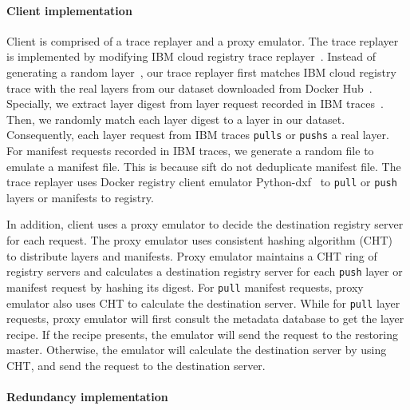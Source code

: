 \paragraph{Client implementation}
Client is comprised of a trace replayer and 
a proxy emulator.
The trace replayer is implemented by modifying IBM cloud registry trace replayer~\cite{xxx}.
Instead of generating a random layer~\cite{xxx},
our trace replayer first matches IBM cloud registry trace with 
the real layers from our dataset downloaded from Docker Hub~\cite{xxx, xxx}.
Specially, we extract layer digest from layer request recorded in IBM traces~\cite{xxx}.
Then, 
we randomly match each layer digest to a layer in our dataset. 
Consequently, each layer request from IBM traces \texttt{pulls} or \texttt{pushs} a real layer.
For manifest requests recorded in IBM traces, we generate a random file to emulate a manifest file.
This is because sift do not deduplicate manifest file.
The trace replayer uses Docker registry client emulator Python-dxf~\cite{xxx} to 
\texttt{pull} or \texttt{push} layers or manifests to registry.

In addition, client uses a proxy emulator to decide the destination registry server for each request.
The proxy emulator uses
consistent hashing algorithm (CHT)~\cite{xxx} to distribute layers and manifests.
 Proxy emulator maintains a CHT ring of registry servers
 and calculates a destination registry server for each \texttt{push} layer or manifest request
 by hashing its digest.%
For \texttt{pull} manifest requests, 
proxy emulator also uses CHT to calculate the destination server.
While for \texttt{pull} layer requests, 
proxy emulator will first consult the metadata database to get the layer recipe.
If the recipe  presents, 
the emulator will send the request to the restoring master.
Otherwise, the emulator will calculate the destination server by using CHT,
and send the request to the destination server.

\paragraph{Redundancy implementation}

